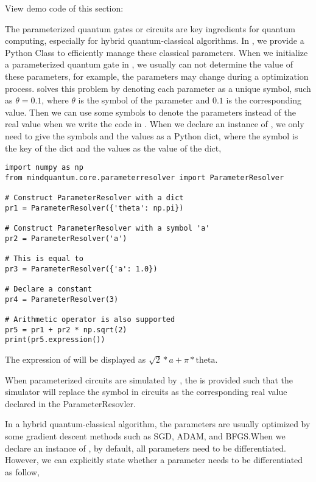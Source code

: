 View demo code of this section: 

The parameterized quantum gates or circuits are key ingredients for quantum computing, especially for hybrid quantum-classical algorithms.
In \MindQuantum, we provide a Python Class  to efficiently manage these classical parameters.
When we initialize a parameterized quantum gate in \MindQuantum, we usually can not determine the value of these parameters, for example, the parameters may change during a optimization process.
\ParameterResolver solves this problem by
denoting each parameter as a unique symbol, such as $\theta=0.1$, where $\theta$ is the symbol of the parameter and $0.1$ is the corresponding value.
Then we can use some symbols to denote the parameters instead of the real value when we write the code in \MindQuantum.
When we declare an instance of \ParameterResolver, we only need to give the symbols and the values as a Python dict, where the symbol is the key of the dict and the values as the value of the dict,

\begin{lstlisting}
import numpy as np
from mindquantum.core.parameterresolver import ParameterResolver

# Construct ParameterResolver with a dict
pr1 = ParameterResolver({'theta': np.pi})

# Construct ParameterResolver with a symbol 'a'
pr2 = ParameterResolver('a')

# This is equal to
pr3 = ParameterResolver({'a': 1.0})

# Declare a constant
pr4 = ParameterResolver(3)

# Arithmetic operator is also supported
pr5 = pr1 + pr2 * np.sqrt(2)
print(pr5.expression())
\end{lstlisting}

The expression of  will be displayed as $\sqrt{2}*a + \pi*\text{theta}$.

When parameterized circuits are simulated by \MindQuantum, the \ParameterResolver is provided such that the simulator will replace the symbol in circuits as the corresponding real value declared in the ParameterResovler.

In a hybrid quantum-classical algorithm, the parameters are usually optimized by some gradient descent methods such as SGD, ADAM, and BFGS.When we declare an instance of \ParameterResolver, by default, all parameters need to be differentiated.
However, we can explicitly state whether a parameter needs to be differentiated as follow,

